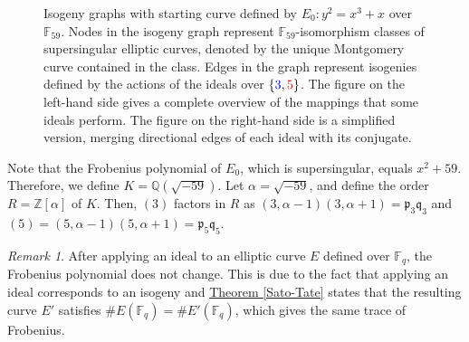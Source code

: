 \documentclass[openany, a4paper, 10pt]{book}
\theoremstyle{plain}
\theoremstyle{plain}
\theoremstyle{plain}
\theoremstyle{definition}
\theoremstyle{plain}
\theoremstyle{definition}
\theoremstyle{remark}
\newtheorem*{remark}{Remark}
\newcommand{\theoref}[1]{\hyperref[#1]{Theorem \ref{#1}}}
\begin{document}
\begin{figure}[!htb]
\begin{minipage}{.43\textwidth}
    \end{minipage}%
    \vspace{-.9em}
    \caption{
        Isogeny graphs with starting curve defined by $E_0: y^2 = x^3 + x$ over $\mathbb F_{59}$.
        Nodes in the isogeny graph represent $\mathbb F_{59}$-isomorphism classes of supersingular elliptic curves, denoted by the unique Montgomery curve contained in the class.
        Edges in the graph represent isogenies defined by the actions of the ideals over $\{ \textcolor{blue}{3}, \textcolor{red}{5} \}$.
        The figure on the left-hand side gives a complete overview of the mappings that some ideals perform.
        The figure on the right-hand side is a simplified version, merging directional edges of each ideal with its conjugate.
    }
    \label{isog_graph}
\end{figure}

Note that the Frobenius polynomial of $E_0$, which is supersingular, equals $x^2 + 59$.
Therefore, we define $K = \mathbb Q(\sqrt{-59})$.
Let $\alpha = \sqrt{-59}$, and define the order $R = \mathbb Z[\alpha]$ of $K$.
Then, $(3)$ factors in $R$ as $(3, \alpha-1)(3, \alpha+1) = \mathfrak p_3 \mathfrak q_3$
and $(5) = (5, \alpha-1)(5, \alpha+1) = \mathfrak p_5 \mathfrak q_5$.

\begin{remark}
    After applying an ideal to an elliptic curve $E$ defined over $\mathbb F_q$, the Frobenius polynomial does not change.
    This is due to the fact that applying an ideal corresponds to an isogeny and \theoref{Sato-Tate} states that the resulting curve $E'$ satisfies $\#E(\mathbb F_q) = \#E'(\mathbb F_q)$, which gives the same trace of Frobenius.
\end{remark}
\end{document}
